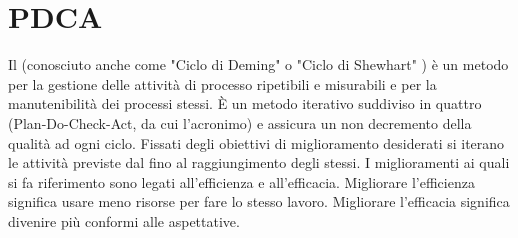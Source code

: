 

\section{PDCA}
		

Il  (conosciuto anche come "Ciclo di Deming" o "Ciclo di Shewhart" ) è un metodo per la gestione delle attività di processo ripetibili e misurabili e per la manutenibilità dei processi stessi. È un metodo iterativo suddiviso in quattro  (Plan-Do-Check-Act, da cui l'acronimo) e assicura un non decremento della qualità ad ogni ciclo. Fissati degli obiettivi di miglioramento desiderati si iterano le attività previste dal  fino al raggiungimento degli stessi. I miglioramenti ai quali si fa riferimento sono legati all'efficienza e all'efficacia. Migliorare l'efficienza significa usare meno risorse per fare lo stesso lavoro. Migliorare l'efficacia significa divenire più conformi alle aspettative.

